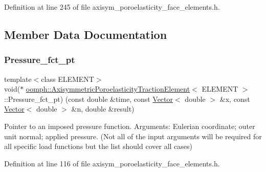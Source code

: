 Definition at line 245 of file axisym\+\_\+poroelasticity\+\_\+face\+\_\+elements.\+h.



\subsection{Member Data Documentation}
\mbox{\label{classoomph_1_1AxisymmetricPoroelasticityTractionElement_a914e7f426769fe5e58d71fb2588449b8}} 
\subsubsection{\texorpdfstring{Pressure\+\_\+fct\+\_\+pt}{Pressure\_fct\_pt}}
{\footnotesize\ttfamily template$<$class E\+L\+E\+M\+E\+NT$>$ \\
void($\ast$ \hyperlink{classoomph_1_1AxisymmetricPoroelasticityTractionElement}{oomph\+::\+Axisymmetric\+Poroelasticity\+Traction\+Element}$<$ E\+L\+E\+M\+E\+NT $>$\+::Pressure\+\_\+fct\+\_\+pt) (const double \&time, const \hyperlink{classoomph_1_1Vector}{Vector}$<$ double $>$ \&x, const \hyperlink{classoomph_1_1Vector}{Vector}$<$ double $>$ \&n, double \&result)\hspace{0.3cm}{\ttfamily [protected]}}



Pointer to an imposed pressure function. Arguments\+: Eulerian coordinate; outer unit normal; applied pressure. (Not all of the input arguments will be required for all specific load functions but the list should cover all cases) 



Definition at line 116 of file axisym\+\_\+poroelasticity\+\_\+face\+\_\+elements.\+h.

\mbox{\label{classoomph_1_1AxisymmetricPoroelasticityTractionElement_a160a754eb4572b56b146126729e89317}} 
